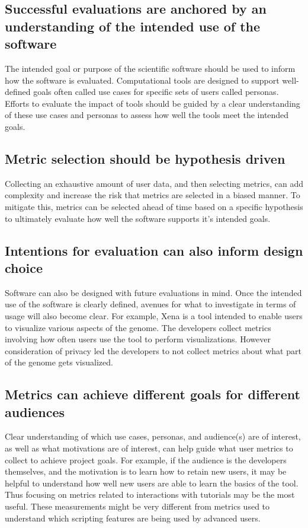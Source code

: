\documentclass{article}
\begin{document}
\subsection{Successful evaluations are anchored by an understanding of the intended use of the software}
\label{sec:use_understanding}
The intended goal or purpose of the scientific software should be used to inform how the software is evaluated. Computational tools are designed to support well-defined goals often called use cases \cite{gamma_design_1995} for specific sets of users called personas\cite{cooper_inmates_2004}. Efforts to evaluate the impact of tools should be guided by a clear understanding of these use cases and personas to assess how well the tools meet the intended goals.  

\subsection{Metric selection should be hypothesis driven} 
\label{sec:hypothesis_driven}
Collecting an exhaustive amount of user data, and then selecting metrics, can add complexity and increase the risk that metrics are selected in a biased manner. To mitigate this, metrics can be selected ahead of time based on a specific hypothesis to ultimately evaluate how well the software supports it’s intended goals. 


\subsection{Intentions for evaluation can also inform design choice} Software can also be designed with future evaluations in mind. Once the intended use of the software is clearly defined, avenues for what to investigate in terms of usage will also become clear. For example, Xena \cite{xena_2020} is a tool intended to enable users to visualize various aspects of the genome. The developers collect metrics involving how often users use the tool to perform  visualizations. However consideration of privacy led the developers to not collect metrics about what part of the genome gets visualized. 




\subsection{Metrics can achieve different goals for different audiences}

Clear understanding of which use cases, personas, and audience(s) are of interest, as well as what motivations are of interest, can help guide what user metrics to collect to achieve project goals.  For example, if the audience is the developers themselves, and the motivation is to learn how to retain new users, it may be helpful to understand how well new users are able to learn the basics of the tool. Thus focusing on metrics related to interactions with tutorials may be the most useful. These measurements might be very different from metrics used to understand which scripting features are being used by advanced users. 
\end{document}
